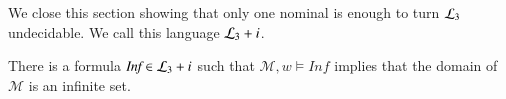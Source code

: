 \begin{pf}
%
%
%
%
\end{pf}

We close this section showing that only one nominal is enough to
turn $\mathcal{L}_3$ undecidable. We call this language $\mathcal{L}_3 + i$.

\begin{thm}
There is a formula $\textit{Inf} \in \mathcal{L}_3 + i$ such that $\mathcal{M},w
\models \textit{Inf}$ implies that the domain of $\mathcal{M}$ is an
infinite set.
\end{thm}

